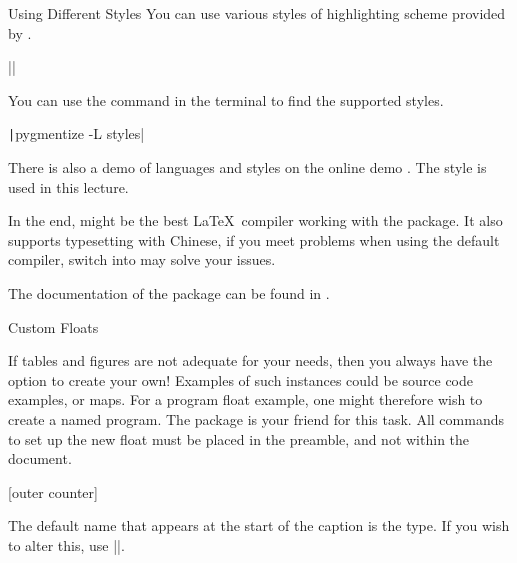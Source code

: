 \begin{frame}[fragile]{Using Different Styles}
You can use various styles of highlighting scheme provided by .
\begin{command}
\LC||
\end{command}

You can use the command in the terminal to find the supported styles. 
\begin{command}
\texttt|pygmentize -L styles|
\end{command}

There is also a demo of languages and styles on the online demo . The  style is used in this lecture. \medskip

In the end,  might be the best \LaTeX\ compiler working with the  package. It also supports typesetting with Chinese, if you meet problems when using the default  compiler, switch into  may solve your issues. \medskip

The documentation of the  package can be found in .

\end{frame}

\begin{frame}[fragile]{Custom Floats}

If tables and figures are not adequate for your needs, then you always have the option to create your own! Examples of such instances could be source code examples, or maps. For a program float example, one might therefore wish to create a  named program. The package  is your friend for this task. All commands to set up the new float must be placed in the preamble, and not within the document.

\begin{command}
\begin{LCL}
\usepackage{float}
[outer counter]
\end{LCL}
\end{command}

The default name that appears at the start of the caption is the type. If you wish to alter this, use \LC||.

\end{frame}

